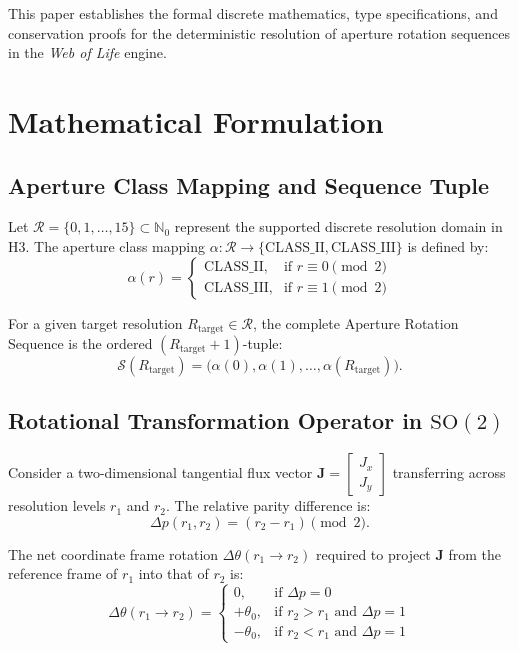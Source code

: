 \documentclass[10pt,journal,compsoc]{IEEEtran}
\begin{document}
This paper establishes the formal discrete mathematics, type specifications, and conservation proofs for the deterministic resolution of aperture rotation sequences in the \textit{Web of Life} engine.

\section{Mathematical Formulation}

\subsection{Aperture Class Mapping and Sequence Tuple}
Let $\mathcal{R} = \{0, 1, \dots, 15\} \subset \mathbb{N}_0$ represent the supported discrete resolution domain in H3. The aperture class mapping $\alpha: \mathcal{R} \to \{\text{CLASS\_II}, \text{CLASS\_III}\}$ is defined by:
\begin{equation}
\alpha(r) = \begin{cases}
\text{CLASS\_II}, & \text{if } r \equiv 0 \pmod 2 \\
\text{CLASS\_III}, & \text{if } r \equiv 1 \pmod 2
\end{cases}
\label{eq:alpha_mapping}
\end{equation}

For a given target resolution $R_{\text{target}} \in \mathcal{R}$, the complete Aperture Rotation Sequence is the ordered $(R_{\text{target}} + 1)$-tuple:
\begin{equation}
\mathcal{S}(R_{\text{target}}) = \Big(\alpha(0), \alpha(1), \dots, \alpha(R_{\text{target}})\Big).
\label{eq:seq_tuple}
\end{equation}

\subsection{Rotational Transformation Operator in $\mathrm{SO}(2)$}
Consider a two-dimensional tangential flux vector $\mathbf{J} = \begin{bmatrix} J_x \\ J_y \end{bmatrix}$ transferring across resolution levels $r_1$ and $r_2$. The relative parity difference is:
\begin{equation}
\Delta p(r_1, r_2) = (r_2 - r_1) \pmod 2.
\end{equation}

The net coordinate frame rotation $\Delta \theta(r_1 \to r_2)$ required to project $\mathbf{J}$ from the reference frame of $r_1$ into that of $r_2$ is:
\begin{equation}
\Delta \theta(r_1 \to r_2) = \begin{cases}
0, & \text{if } \Delta p = 0 \\
+\theta_0, & \text{if } r_2 > r_1 \text{ and } \Delta p = 1 \\
-\theta_0, & \text{if } r_2 < r_1 \text{ and } \Delta p = 1
\end{cases}
\end{equation}
\end{document}
